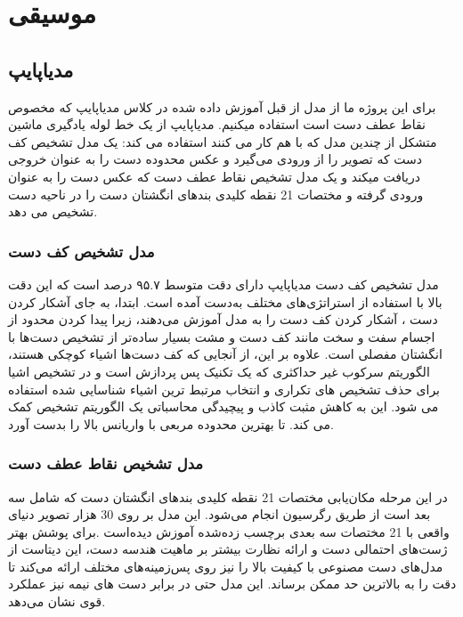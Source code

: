 \chapter{موسیقی}
\section{مدیاپایپ}
برای این پروژه ما از مدل از قبل آموزش داده شده در کلاس مدیاپایپ که مخصوص نقاط عطف دست است استفاده میکنیم. مدیاپایپ  از یک خط لوله
یادگیری ماشین متشکل از چندین مدل که با هم کار می کنند استفاده می کند: یک مدل تشخیص کف دست 
که تصویر را از ورودی می‌گیرد و  عکس محدوده دست را به عنوان خروجی دریافت میکند و یک مدل تشخیص نقاط عطف دست 
که عکس دست را به عنوان ورودی گرفته و مختصات‌ 21 نقطه کلیدی بند‌های انگشتان دست را در ناحیه دست تشخیص می دهد.

\subsection{مدل تشخیص کف دست}
مدل تشخیص کف دست مدیاپایپ دارای دقت متوسط ۹۵.۷ درصد است که این دقت بالا با استفاده از استراتژی‌های مختلف به‌دست آمده است. ابتدا، به جای آشکار کردن دست
، آشکار کردن کف دست را به مدل آموزش می‌دهند، زیرا پیدا کردن محدود از اجسام سفت و سخت مانند کف دست و مشت بسیار ساده‌تر از تشخیص دست‌ها با 
انگشتان مفصلی است. علاوه بر این، از آنجایی که کف دست‌ها اشیاء کوچکی هستند، الگوریتم سرکوب غیر حداکثری 
که یک تکنیک پس پردازش  است و در تشخیص اشیا برای حذف تشخیص های تکراری 
و انتخاب مرتبط ترین اشیاء شناسایی شده استفاده می شود. این به کاهش مثبت کاذب  و پیچیدگی محاسباتی 
یک الگوریتم تشخیص کمک می کند. تا بهترین محدوده مربعی  با واریانس بالا  را بدست آورد. \cite{zhang2020mediapipe}

\subsection{مدل تشخیص نقاط عطف دست}
در این مرحله مکان‌یابی مختصات 21 نقطه کلیدی بند‌های انگشتان دست که شامل سه بعد است از طریق رگرسیون 
انجام می‌شود. این مدل بر روی 30 هزار تصویر دنیای واقعی با 21 مختصات سه بعدی برچسب زده‌شده 
آموزش دیده‌است .برای پوشش بهتر ژست‌های احتمالی دست و ارائه نظارت بیشتر بر ماهیت هندسه دست، این دیتاست از مدل‌های دست مصنوعی
با کیفیت بالا را نیز روی پس‌زمینه‌های مختلف ارائه می‌کند تا دقت را به بالاترین حد ممکن برساند. این مدل حتی در برابر دست های نیمه نیز عملکرد قوی نشان می‌دهد. \cite{zhang2020mediapipe}

